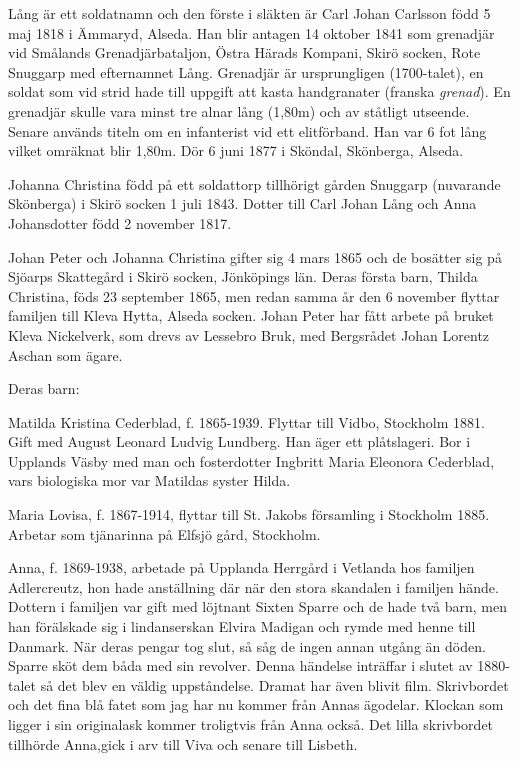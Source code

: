 Lång är ett soldatnamn och den förste i släkten är Carl Johan Carlsson född 5 maj 1818 i Ämmaryd, Alseda. Han blir antagen 14 oktober 1841 som grenadjär vid Smålands Grenadjärbataljon, Östra Härads Kompani, Skirö socken, Rote Snuggarp med efternamnet Lång. Grenadjär är ursprungligen (1700-talet), en soldat som vid strid hade till uppgift att kasta handgranater (franska {\it grenad}\/). En grenadjär skulle vara minst tre alnar lång (1,80m) och av ståtligt utseende. Senare används titeln om en infanterist vid ett elitförband.
Han var 6 fot lång vilket omräknat blir 1,80m.
Dör 6 juni 1877 i Sköndal, Skönberga, Alseda.

Johanna Christina född på ett soldattorp tillhörigt gården Snuggarp (nuvarande Skönberga) i Skirö socken 1 juli 1843. Dotter till Carl Johan Lång och Anna Johansdotter född 2 november 1817. 



\noindent\titlcap Johan Peter och Johanna Christina gifter sig 4 mars 1865 och de bosätter sig på Sjöarps Skattegård i Skirö socken, Jönköpings län. Deras första barn, Thilda Christina, föds 23 september 1865, men redan samma år den 6 november flyttar familjen till Kleva Hytta, Alseda socken. Johan Peter har fått arbete på bruket Kleva Nickelverk, som drevs av Lessebro Bruk, med Bergsrådet Johan Lorentz Aschan som ägare. 

Deras barn:

Matilda Kristina Cederblad, f. 1865-1939. Flyttar till Vidbo, Stockholm 1881. Gift med August Leonard Ludvig Lundberg. Han äger ett plåtslageri. Bor i Upplands Väsby med man och fosterdotter Ingbritt Maria Eleonora Cederblad, vars biologiska mor var Matildas syster Hilda.

Maria Lovisa, f. 1867-1914, flyttar till St. Jakobs församling i Stockholm 1885. Arbetar som tjänarinna på Elfsjö gård, Stockholm.

Anna, f. 1869-1938, arbetade på Upplanda Herrgård i Vetlanda hos familjen Adlercreutz, hon hade anställning där när den stora skandalen i familjen hände. Dottern i familjen var gift med löjtnant Sixten Sparre och de hade två barn, men han förälskade sig i  lindanserskan Elvira Madigan och rymde med henne till Danmark. När deras pengar tog slut, så såg de ingen annan utgång än döden. Sparre sköt dem båda med sin revolver. Denna händelse inträffar i slutet av 1880-talet så det blev en väldig uppståndelse. Dramat har även blivit film. Skrivbordet och det fina blå fatet som jag har nu  kommer från Annas ägodelar. Klockan som ligger i sin originalask kommer troligtvis från Anna också. Det lilla skrivbordet tillhörde Anna,gick i arv till Viva och senare till Lisbeth.


